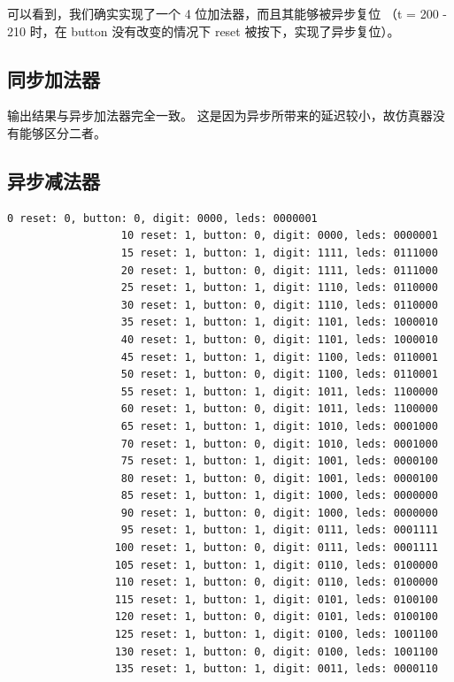 \documentclass[11pt,a4paper]{article}
\begin{document}
可以看到，我们确实实现了一个 4 位加法器，而且其能够被异步复位
（t = 200 - 210 时，在 button 没有改变的情况下 reset 被按下，实现了异步复位）。

\subsection{同步加法器}
输出结果与异步加法器完全一致。
这是因为异步所带来的延迟较小，故仿真器没有能够区分二者。

\subsection{异步减法器}
\begin{Verbatim}[fontsize=\scriptsize]
                   0 reset: 0, button: 0, digit: 0000, leds: 0000001
                  10 reset: 1, button: 0, digit: 0000, leds: 0000001
                  15 reset: 1, button: 1, digit: 1111, leds: 0111000
                  20 reset: 1, button: 0, digit: 1111, leds: 0111000
                  25 reset: 1, button: 1, digit: 1110, leds: 0110000
                  30 reset: 1, button: 0, digit: 1110, leds: 0110000
                  35 reset: 1, button: 1, digit: 1101, leds: 1000010
                  40 reset: 1, button: 0, digit: 1101, leds: 1000010
                  45 reset: 1, button: 1, digit: 1100, leds: 0110001
                  50 reset: 1, button: 0, digit: 1100, leds: 0110001
                  55 reset: 1, button: 1, digit: 1011, leds: 1100000
                  60 reset: 1, button: 0, digit: 1011, leds: 1100000
                  65 reset: 1, button: 1, digit: 1010, leds: 0001000
                  70 reset: 1, button: 0, digit: 1010, leds: 0001000
                  75 reset: 1, button: 1, digit: 1001, leds: 0000100
                  80 reset: 1, button: 0, digit: 1001, leds: 0000100
                  85 reset: 1, button: 1, digit: 1000, leds: 0000000
                  90 reset: 1, button: 0, digit: 1000, leds: 0000000
                  95 reset: 1, button: 1, digit: 0111, leds: 0001111
                 100 reset: 1, button: 0, digit: 0111, leds: 0001111
                 105 reset: 1, button: 1, digit: 0110, leds: 0100000
                 110 reset: 1, button: 0, digit: 0110, leds: 0100000
                 115 reset: 1, button: 1, digit: 0101, leds: 0100100
                 120 reset: 1, button: 0, digit: 0101, leds: 0100100
                 125 reset: 1, button: 1, digit: 0100, leds: 1001100
                 130 reset: 1, button: 0, digit: 0100, leds: 1001100
                 135 reset: 1, button: 1, digit: 0011, leds: 0000110

\end{Verbatim}
\end{document}
